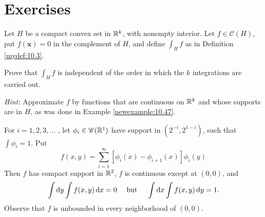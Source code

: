 
\section{Exercises}


\begin{myexercise}
    \label{ex:10.1}
    Let $H$ be a compact convex set in ${\protect\mathbb R}^k$, with nonempty interior. 
    Let $f \in \mathscr{C}(H)$, put $f(\mathbf{x}) = 0$ in the complement of $H$, 
    and define $\int_H f$ as in Definition \ref{mydef:10.3}.

    Prove that $\int_H f$ is independent of the order in which the $k$ integrations are carried out.

    \emph{Hint:} Approximate $f$ by functions that are continuous on ${\protect\mathbb R}^k$ and whose supports are in $H$, as was done in Example \ref{newexample:10.47}.
\end{myexercise}


\begin{myexercise}
    \label{ex:10.2}
    For $i = 1, 2, 3, ...$ , let $\phi_i \in \mathscr{C}({\protect\mathbb R}^1)$ have support in $(2^{-i} , 2^{1-i})$, such that $\int \phi_i = 1$.
    Put
    \begin{equation*}
        f(x,y) = \sum_{i=1}^{\infty}
        \left[ 
            \phi_{i}(x) -
            \phi_{i+1}(x)
         \right] \phi_i (y)
    \end{equation*}
    Then $f$ has compact support in ${\protect\mathbb R}^2$, 
    $f$ is continuous except at $(0,0)$,
    and 
    \begin{equation*}
        \int \d y \int f(x,y) \d x = 0
        \quad \text{ but } \quad
        \int \d x \int f(x,y) \d y = 1.
    \end{equation*}
    Observe that $f$ is unbounded in every neighborhood of $(0, 0)$.
\end{myexercise}


